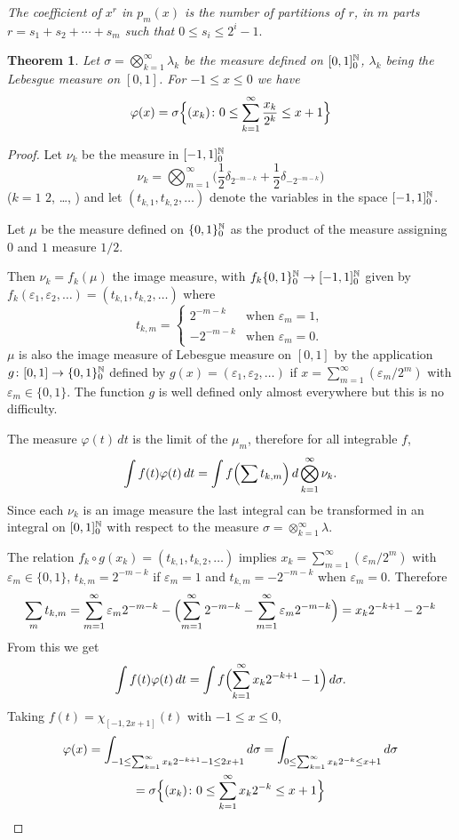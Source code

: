 \documentclass[10pt]{amsart}
\newtheorem{thm}{Theorem}
\theoremstyle{definition}
\theoremstyle{remark}
\begin{document}
\emph{The coefficient of $x^r$ in $p_m(x)$ is the number of partitions of $r$, in $m$ parts
$r=s_1+s_2+\cdots+s_m$ such that $0\le s_i\le 2^i-1$}.

\begin{thm}\label{T:3}
Let $\sigma=\bigotimes_{k=1}^\infty \lambda_k$ be the measure defined on $[0,1]^\mathbb{N}_{0}$, $\lambda_k$
being the Lebesgue measure on $[0,1]$. For $-1\le x\le 0$ we have
\[\varphi(x)=\sigma\Bigl\{(x_k)\colon 0\le \sum_{k=1}^\infty\frac{x_k}{2^k}\le x+1\Bigr\}\]
\end{thm}
\begin{proof}
Let $\nu_k$ be the measure in $[-1,1]^\mathbb{N}_{0}$
\[\nu_k=\bigotimes_{m=1}^\infty \bigl(\frac12\delta_{2^{-m-k}}+\frac12\delta_{-2^{-m-k}}\bigr)\]
($k=1$ $2$, \dots, ) and let $(t_{k,1}, t_{k,2},\dots)$ denote the variables in the space
$[-1,1]^\mathbb{N}_{0}$.

Let $\mu$ be the measure defined on $\{0,1\}^\mathbb{N}_{0}$ as the product of the measure
assigning $0$ and $1$ measure $1/2$. 

Then $\nu_k=f_k(\mu)$ the image measure, with $f_k\{0,1\}^\mathbb{N}_{0}\to[-1,1]^\mathbb{N}_{0}$ given by
$f_k(\varepsilon_1,\varepsilon_2,\dots)=(t_{k,1}, t_{k,2},\dots)$ where
\[t_{k,m}=\begin{cases}
2^{-m-k} & \text{when $\varepsilon_m=1$},\\
-2^{-m-k}  & \text{when $\varepsilon_m=0$}.
\end{cases}\]
$\mu$ is also the image measure of Lebesgue measure on $[0,1]$ by the application 
$g\colon[0,1]\to \{0,1\}^\mathbb{N}_{0}$ defined by $g(x)=(\varepsilon_1,\varepsilon_2,\dots)$
if $x=\sum_{m=1}^\infty (\varepsilon_m/2^m)$ with $\varepsilon_m\in\{0,1\}$. The function
$g$ is well defined only almost everywhere but this is no difficulty. 

The measure $\varphi(t)\,dt$ is the limit of the $\mu_m$, therefore for all integrable
$f$, 
\[\int f(t)\varphi(t)\,dt=\int f\Bigl(\sum t_{k,m}\Bigr)\,d\bigotimes_{k=1}^\infty \nu_k.\]
Since each $\nu_k$ is an image measure the last integral can be transformed in an 
integral on $[0,1]^\mathbb{N}_{0}$ with respect to the measure $\sigma=\otimes _{k=1}^\infty\lambda$.

The relation $f_k\circ g(x_k)=(t_{k,1},t_{k,2},\dots)$ implies 
$x_k=\sum_{m=1}^\infty (\varepsilon_m/2^m)$ with $\varepsilon_m\in\{0,1\}$, 
$t_{k,m}=2^{-m-k}$ if $\varepsilon_m=1$ and $t_{k,m}=-2^{-m-k}$ when $\varepsilon_m=0$.
Therefore
\[\sum_m t_{k,m}=\sum_{m=1}^\infty \varepsilon_m2^{-m-k}-
\Bigl(\sum_{m=1}^\infty 2^{-m-k}-\sum_{m=1}^\infty \varepsilon_m2^{-m-k}\Bigr)=
x_k2^{-k+1}-2^{-k}\]
From this we get
\[\int f(t)\varphi(t)\,dt=\int f\Bigl(\sum_{k=1}^\infty x_k2^{-k+1}-1\Bigr)\,d\sigma.\]
Taking $f(t)=\chi_{[-1,2x+1]}(t)$ with $-1\le x\le 0$,
\begin{multline}\label{E:20}
\varphi(x) =\int_{-1\le \sum_{k=1}^\infty x_k2^{-k+1}-1\le 2x+1} d\sigma=
\int_{0\le \sum_{k=1}^\infty x_k2^{-k}\le x+1} d\sigma\\=
\sigma\Bigl\{(x_k)\colon 0\le \sum_{k=1}^\infty x_k2^{-k}\le x+1\Bigr\}
\end{multline}


\end{proof}
\end{document}
